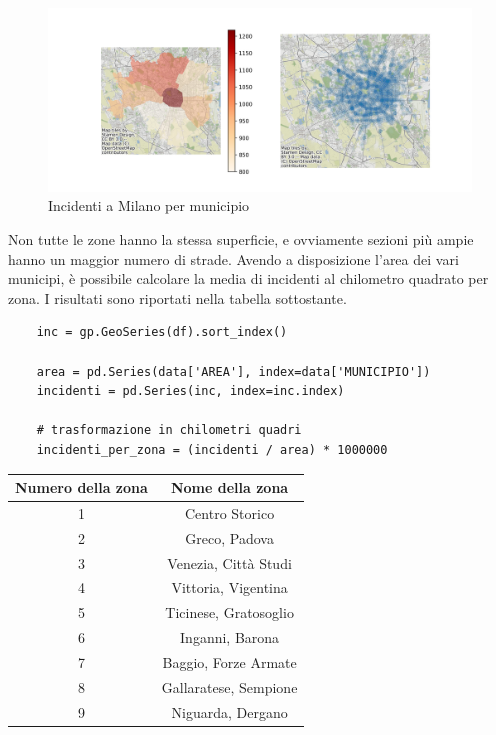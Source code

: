 \documentclass[a4paper,12pt]{report}
\begin{document}
\begin{figure}
    \includegraphics[width=\linewidth]{../src/municipi_milano/incidenti_municipio.png}
    \caption{Incidenti a Milano per municipio}
    \label{fig:heatmap-municipi}
\end{figure}

Non tutte le zone hanno la stessa superficie, e ovviamente sezioni più ampie hanno un maggior 
numero di strade. Avendo a disposizione l'area dei vari municipi, 
è possibile calcolare la media di incidenti al chilometro quadrato per zona.
I risultati sono riportati nella tabella sottostante.

\begin{lstlisting}    
    inc = gp.GeoSeries(df).sort_index()

    area = pd.Series(data['AREA'], index=data['MUNICIPIO'])
    incidenti = pd.Series(inc, index=inc.index)

    # trasformazione in chilometri quadri
    incidenti_per_zona = (incidenti / area) * 1000000 
\end{lstlisting}

\begin{center}
    \def\arraystretch{1.5}%
    \begin{tabular}{ |c|c| } 
    \hline
    Numero della zona & Nome della zona \\ 
    \hline
    \rowcolor{TableGray}
    1   &   Centro Storico\\
    2   &   Greco, Padova\\
    \rowcolor{TableGray}
    3   &   Venezia, Città Studi\\
    4   &   Vittoria, Vigentina \\
    \rowcolor{TableGray}
    5   &   Ticinese, Gratosoglio\\
    6   &   Inganni, Barona\\
    \rowcolor{TableGray}
    7   &   Baggio, Forze Armate\\
    8   &   Gallaratese, Sempione\\
    \rowcolor{TableGray}
    9   &   Niguarda, Dergano\\
    \hline
    \end{tabular}
\end{center}
\end{document}
